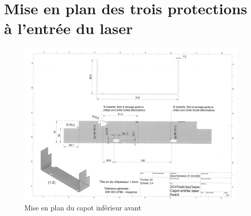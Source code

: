 

\section{Mise en plan des trois protections à l'entrée du laser}
\begin{figure}[H]
    \centering
    \includegraphics[angle=90,width=\textwidth]{assets/figures/Annexes/Mises_en_plan/mise_en_plan_avant.png}
    \caption{Mise en plan du capot inférieur avant}
    \label{mise_en_plan_capot_avant}
\end{figure}

